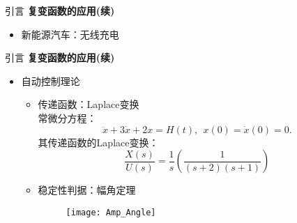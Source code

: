 \documentclass{beamer}
\begin{document}
\begin{frame}{引言}
\textbf{复变函数的应用(续)}
\begin{itemize}
    \item 新能源汽车：无线充电\\
    
\begin{figure}
    \setcounter{subfigure}{0}
\centering  %

\end{figure}

    
\end{itemize}



\end{frame}



\begin{frame}{引言}
\textbf{复变函数的应用(续)}
\begin{itemize}

    \item 自动控制理论
    
    \begin{itemize}
        \item 传递函数：Laplace变换\\
        常微分方程：
        \begin{equation}
        \ddot{x}+3\dot{x}+2x=H(t), \ \  x(0)=\dot{x}(0) =0. 
\end{equation}
        其传递函数的Laplace变换：
        $$\frac{X(s)}{U(s)}=\frac{1}{s}\left(\frac{1}{(s+2)(s+1)}\right)$$
        \item 稳定性判据：幅角定理
        \begin{figure}
        \setcounter{figure}{0}
        \texttt{[image: Amp\_Angle]}
        \end{figure}
    \end{itemize}
     \end{itemize}
\end{frame}


%
%
\end{document}
